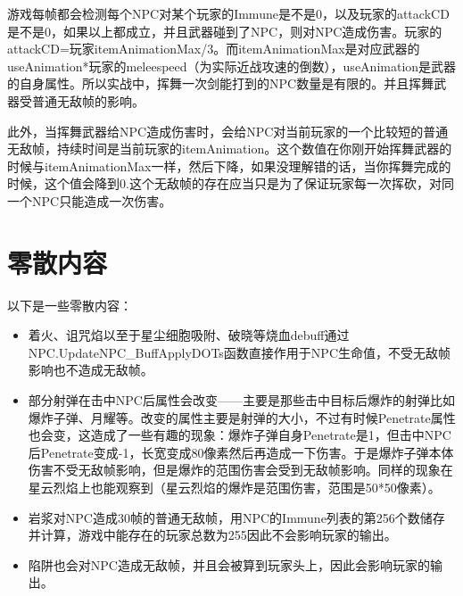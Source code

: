 游戏每帧都会检测每个NPC对某个玩家的Immune是不是0，以及玩家的attackCD是不是0，如果以上都成立，并且武器碰到了NPC，则对NPC造成伤害。玩家的attackCD=玩家itemAnimationMax/3。而itemAnimationMax是对应武器的useAnimation*玩家的meleespeed（为实际近战攻速的倒数），useAnimation是武器的自身属性。所以实战中，挥舞一次剑能打到的NPC数量是有限的。并且挥舞武器受普通无敌帧的影响。

此外，当挥舞武器给NPC造成伤害时，会给NPC对当前玩家的一个比较短的普通无敌帧，持续时间是当前玩家的itemAnimation。这个数值在你刚开始挥舞武器的时候与itemAnimationMax一样，然后下降，如果没理解错的话，当你挥舞完成的时候，这个值会降到0.这个无敌帧的存在应当只是为了保证玩家每一次挥砍，对同一个NPC只能造成一次伤害。

\section{零散内容}

以下是一些零散内容：

\begin{itemize}
\item 着火、诅咒焰以至于星尘细胞吸附、破晓等烧血debuff通过NPC.UpdateNPC\_Buff\allowbreak ApplyDOTs函数直接作用于NPC生命值，不受无敌帧影响也不造成无敌帧。
\item 部分射弹在击中NPC后属性会改变——主要是那些击中目标后爆炸的射弹比如爆炸子弹、月耀等。改变的属性主要是射弹的大小，不过有时候Penetrate属性也会变，这造成了一些有趣的现象：爆炸子弹自身Penetrate是1，但击中NPC后Penetrate变成-1，长宽变成80像素然后再造成一下伤害。于是爆炸子弹本体伤害不受无敌帧影响，但是爆炸的范围伤害会受到无敌帧影响。同样的现象在星云烈焰上也能观察到（星云烈焰的爆炸是范围伤害，范围是50*50像素）。
\item 岩浆对NPC造成30帧的普通无敌帧，用NPC的Immune列表的第256个数储存并计算，游戏中能存在的玩家总数为255因此不会影响玩家的输出。
\item 陷阱也会对NPC造成无敌帧，并且会被算到玩家头上，因此会影响玩家的输出。
\end{itemize}